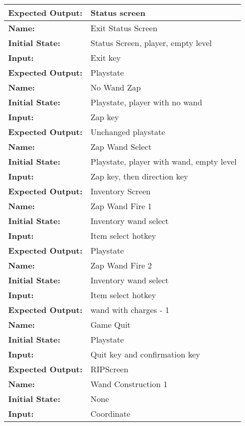 \documentclass[12pt, titlepage]{article}
\begin{document}
\begin{center}
\begin{longtable}{ l | p{10cm} }
				\textbf{Expected Output:} & Status screen\\[0.6em]
				\hline
				\rule{0pt}{1.5em}\textbf{Name:} & Exit Status Screen\\
				\textbf{Initial State:} & Status Screen, player, empty level\\
				\textbf{Input:} & Exit key\\
				\textbf{Expected Output:} & Playstate\\[0.6em]
				\hline
				\rule{0pt}{1.5em}\textbf{Name:} & No Wand Zap\\
				\textbf{Initial State:} & Playstate, player with no wand\\
				\textbf{Input:} & Zap key\\
				\textbf{Expected Output:} & Unchanged playstate\\[0.6em]
				\hline
				\rule{0pt}{1.5em}\textbf{Name:} & Zap Wand Select\\
				\textbf{Initial State:} & Playstate, player with wand, empty level \\
				\textbf{Input:} & Zap key, then direction key\\
				\textbf{Expected Output:} & Inventory Screen\\[0.6em]
				\hline
				\rule{0pt}{1.5em}\textbf{Name:} & Zap Wand Fire 1\\
				\textbf{Initial State:} & Inventory wand select\\
				\textbf{Input:} & Item select hotkey\\
				\textbf{Expected Output:} & Playstate\\[0.6em]
				\hline
				\rule{0pt}{1.5em}\textbf{Name:} & Zap Wand Fire 2\\
				\textbf{Initial State:} & Inventory wand select\\
				\textbf{Input:} & Item select hotkey\\
				\textbf{Expected Output:} & wand with charges - 1\\[0.6em]
				\hline
				\rule{0pt}{1.5em}\textbf{Name:} & Game Quit\\
				\textbf{Initial State:} & Playstate\\
				\textbf{Input:} & Quit key and confirmation key\\
				\textbf{Expected Output:} & RIPScreen\\[0.6em]
				\hline
				\rule{0pt}{1.5em}\textbf{Name:} & Wand Construction 1\\
				\textbf{Initial State:} & None\\
				\textbf{Input:} & Coordinate\\

\end{longtable}
\end{center}
\end{document}
